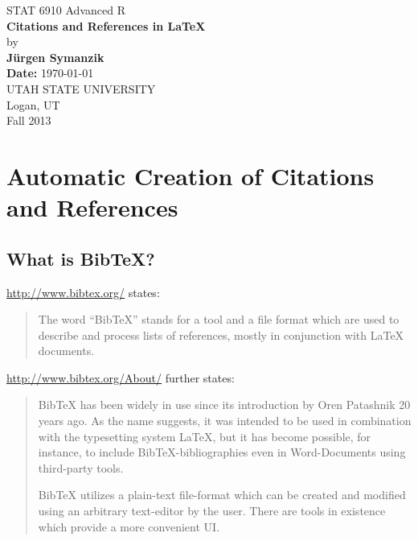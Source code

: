 \documentclass[12pt]{article}
\begin{document}


\begin{titlepage}

\begin{center}
{\large STAT 6910 Advanced R} \\[4cm]

{\LARGE \bf Citations and References in LaTeX} \\[1cm]
by \\[0.5cm]
{\bf J\"urgen Symanzik} \\[2.5cm]
{\bf Date:} \today \\[2cm]

UTAH STATE UNIVERSITY \\[0.5cm]
Logan, UT \\[0.5cm]
Fall 2013 \\[0.5cm]
\end{center}

\thispagestyle{empty}
\vfill
\end{titlepage}


\newpage 



\tableofcontents


\newpage



\section{Automatic Creation of Citations and References}


\subsection{What is BibTeX?}

\url{http://www.bibtex.org/} states:
\begin{quotation}
The word ``BibTeX'' stands for a tool and a file format which are used to describe and process lists of references, mostly in conjunction with LaTeX documents.
\end{quotation}


\noindent
\url{http://www.bibtex.org/About/} further states:
\begin{quotation}
BibTeX has been widely in use since its introduction by Oren Patashnik 20 years ago. As the name suggests, it was intended to be used in combination with the typesetting system LaTeX, but it has become possible, for instance, to include BibTeX-bibliographies even in Word-Documents using third-party tools.

BibTeX utilizes a plain-text file-format which can be created and modified using an arbitrary text-editor by the user. There are tools in existence which provide a more convenient UI.
\end{quotation}
\end{document}
